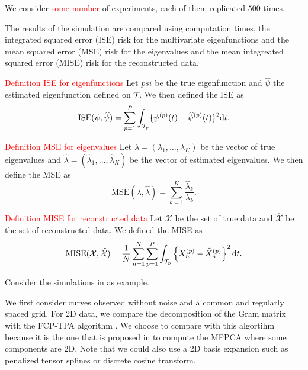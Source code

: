 We consider \textcolor{red}{some number} of experiments, each of them replicated $500$ times.

The results of the simulation are compared using computation times, the integrated squared error (ISE) risk for the multivariate eigenfunctions and the mean squared error (MSE) risk for the eigenvalues and the mean integreated squared error (MISE) risk for the reconstructed data.

\textcolor{red}{Definition ISE for eigenfunctions}
Let $psi$ be the true eigenfunction and $\widehat{\psi}$ the estimated eigenfunction defined on $\mathcal{T}_{}$. We then defined the ISE as 
\begin{equation}\label{eq:ise_eigenfunctions}
    \text{ISE}(\psi, \widehat{\psi}) = \sum_{p = 1}^P \int_{\mathcal{T}_{p}} \{\psi^{(p)}(t) - \widehat{\psi}^{(p)}(t)\}^2 {\rm d} t.
\end{equation}

\textcolor{red}{Definition MSE for eigenvalues}
Let $\lambda = (\lambda_1, \dots, \lambda_K)$ be the vector of true eigenvalues and $\widehat{\lambda} = (\widehat{\lambda}_1, \dots, \widehat{\lambda}_K)$ be the vector of estimated eigenvalues. We then define the MSE as 
\begin{equation}\label{eq:mse_eigenvalues}
    \text{MSE}(\lambda, \widehat{\lambda}) = \sum_{k = 1}^K \frac{\widehat{\lambda}_k}{\lambda_k}.
\end{equation}

\textcolor{red}{Definition MISE for reconstructed data}
Let $\mathcal{X}$ be the set of true data and $\widehat{\mathcal{X}}$ be the set of reconstructed data. We defined the MISE as
\begin{equation}\label{eq:mise_reconstructed_data}
    \text{MISE}(\mathcal{X}, \widehat{\mathcal{X}}) = \frac{1}{N}\sum_{n = 1}^N \sum_{p = 1}^P \int_{\mathcal{T}_{p}} \left\{X_n^{(p)} - \widehat{X}_n^{(p)} \right\}^2 {\rm d} t.
\end{equation}

Consider the simulations in \cite{happMultivariateFunctionalPrincipal2015} as example.

We first consider curves observed without noise and a common and regularly spaced grid. For 2D data, we compare the decomposition of the Gram matrix with the FCP-TPA algorithm \cite{allenMultiwayFunctionalPrincipal2013a}. We choose to compare with this algortihm because it is the one that is proposed in \cite{happMultivariateFunctionalPrincipal2015} to compute the MFPCA where some components are 2D. Note that we could also use a 2D basis expansion such as penalized tensor splines or discrete cosine transform.

